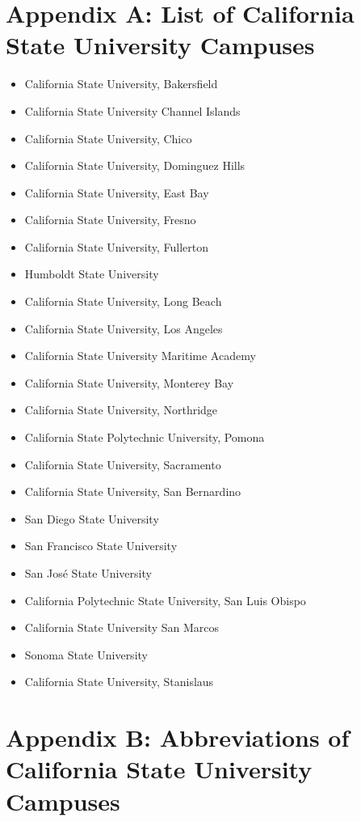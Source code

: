 \appendix
\addappheadtotoc



\section{Appendix A: List of California State University Campuses}

\begin{itemize}
\item California State University, Bakersfield
\item California State University Channel Islands
\item California State University, Chico
\item California State University, Dominguez Hills
\item California State University, East Bay
\item California State University, Fresno
\item California State University, Fullerton
\item Humboldt State University
\item California State University, Long Beach
\item California State University, Los Angeles
\item California State University Maritime Academy
\item California State University, Monterey Bay
\item California State University, Northridge
\item California State Polytechnic University, Pomona
\item California State University, Sacramento
\item California State University, San Bernardino
\item San Diego State University
\item San Francisco State University
\item San José State University
\item California Polytechnic State University, San Luis Obispo
\item California State University San Marcos
\item Sonoma State University
\item California State University, Stanislaus
\end{itemize}


\section{Appendix B: Abbreviations of California State University Campuses}

